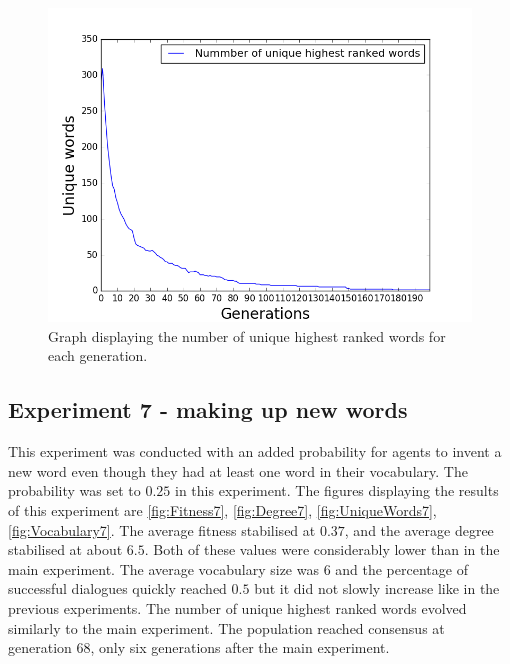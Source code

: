 \begin{figure}[htbp]
    \centering
    \includegraphics[scale=0.5]{fig/Results/Exp6.1/UniqueWords1}
    \caption{Graph displaying the number of unique highest ranked words for each generation.}
    \label{fig:UniqueWords6.1}
\end{figure}


\subsection{Experiment 7 - making up new words}
This experiment was conducted with an added probability for agents to invent a new word even though they had at least one word in their vocabulary. The probability was set to $0.25$ in this experiment. The figures displaying the results of this experiment are \ref{fig:Fitness7}, \ref{fig:Degree7}, \ref{fig:UniqueWords7}, \ref{fig:Vocabulary7}. The average fitness stabilised at $0.37$, and the average degree stabilised at about $6.5$. Both of these values were considerably lower than in the main experiment. The average vocabulary size was $6$ and the percentage of successful dialogues quickly reached $0.5$ but it did not slowly increase like in the previous experiments. The number of unique highest ranked words evolved similarly to the main experiment. The population reached consensus at generation $68$, only six generations after the main experiment. 

